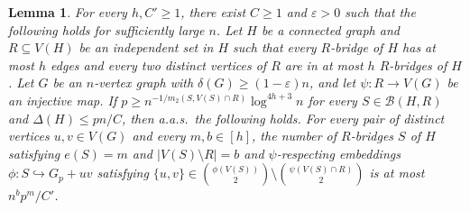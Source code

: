 \documentclass[11pt]{article}
\numberwithin{equation}{section}
\newcounter{i}
\theoremstyle{plain}
\newtheorem{lem}[thm]{Lemma}
\theoremstyle{plain} %
\theoremstyle{definition}
\newcommand{\cB}{\mathcal{B}}
\newcommand{\aas}{a.a.s.\ }
\begin{document}
\begin{lem}\label{lem:B-degree-bound}
    For every $h, C'\ge 1$, there exist $C\ge 1$ and $\varepsilon > 0$ such that the following holds for sufficiently large $n$. Let $H$ be a connected graph and $R\subseteq V(H)$ be an independent set in $H$ such that every $R$-bridge of $H$ has at most $h$ edges and every two distinct vertices of $R$ are in at most $h$ $R$-bridges of $H$. Let $G$ be an $n$-vertex graph with $\delta(G) \ge (1-\varepsilon)n$, and let $\psi : R \rightarrow V(G)$ be an injective map.  If $p \geq n^{-1/m_2(S,V(S)\cap R)} \log^{4h+3} n$ for every $S \in \cB(H, R)$ and $\Delta(H)\le {pn}/{C}$, then \aas the following holds.
    For every pair of distinct vertices $u, v \in V(G)$ and every $m,b \in [h]$, the number of $R$-bridges $S$ of $H$ satisfying $e(S) = m$ and $|V(S)\setminus R| = b$ and $\psi$-respecting embeddings $\phi : S \hookrightarrow G_p + uv$ satisfying $\{u,v\} \in \binom{\phi(V(S))}{2}\setminus \binom{\psi(V(S)\cap R)}{2}$ is at most $n^b p^m / C'$.
\end{lem}
\end{document}
